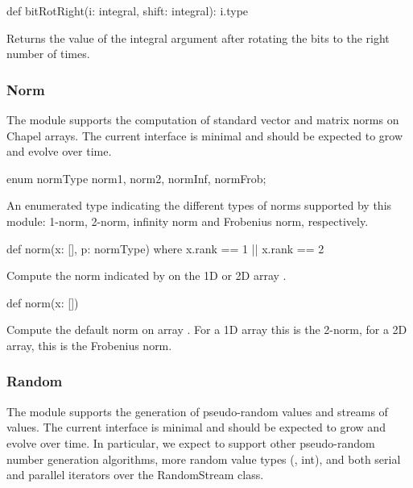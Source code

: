\begin{protohead}
def bitRotRight(i: integral, shift: integral): i.type
\end{protohead}
\begin{protobody}
Returns the value of the integral argument  after rotating the
bits to the right  number of times.
\end{protobody}


\subsubsection{Norm}
\label{Norm}

The module  supports the computation of standard vector and
matrix norms on Chapel arrays.  The current interface is minimal and
should be expected to grow and evolve over time.

\begin{protohead}
enum normType {norm1, norm2, normInf, normFrob};
\end{protohead}
\begin{protobody}
An enumerated type indicating the different types of norms supported
by this module: 1-norm, 2-norm, infinity norm and Frobenius norm,
respectively.
\end{protobody}

\begin{protohead}
def norm(x: [], p: normType) where x.rank == 1 || x.rank == 2
\end{protohead}
\begin{protobody}
Compute the norm indicated by  on the 1D or 2D array .
\end{protobody}

\begin{protohead}
def norm(x: [])
\end{protohead}
\begin{protobody}
Compute the default norm on array .  For a 1D array this is
the 2-norm, for a 2D array, this is the Frobenius norm.
\end{protobody}

\subsubsection{Random}
\label{Random}

The module  supports the generation of pseudo-random
values and streams of values.  The current interface is minimal and
should be expected to grow and evolve over time.  In particular, we
expect to support other pseudo-random number generation algorithms,
more random value types (\eg, int), and both serial and parallel
iterators over the RandomStream class.

